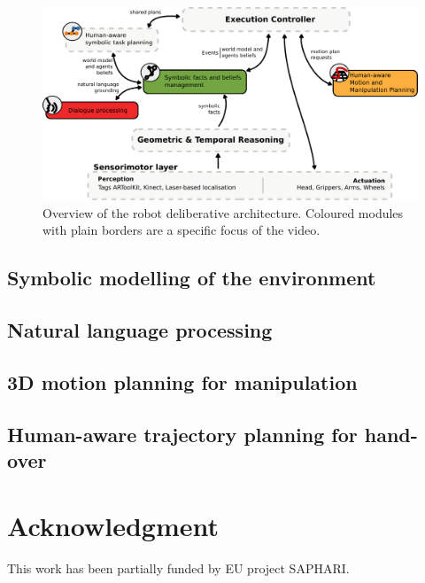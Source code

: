 \documentclass[conference]{IEEEtran}
\begin{document}
\begin{figure}
        \centering
        \includegraphics[width=0.9\columnwidth]{archi}
        \caption{Overview of the robot deliberative architecture. Coloured modules with plain borders are a specific focus of the video.}
        \label{fig|archi}
\end{figure}

\subsection{Symbolic modelling of the environment}



\subsection{Natural language processing}

\subsection{3D motion planning for manipulation}

\subsection{Human-aware trajectory planning for hand-over}

\section*{Acknowledgment}

This work has been partially funded by EU project SAPHARI.




\end{document}

